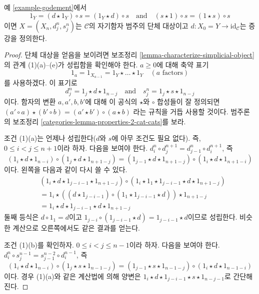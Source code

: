\begin{lemma}
\label{lemma-godement}
예 \ref{example-godement}에서
$$
1_Y = (d \star 1_Y) \circ s = (1_Y \star d) \circ s
\quad\text{and}\quad
(s \star 1) \circ s = (1 \star s) \circ s
$$
이면 $X = (X_n, d^n_j, s^n_j)$는 $\mathcal{C}$의 자기함자 범주의
단체 대상이고 $d : X_0 = Y \to \text{id}_\mathcal{C}$는 증강을
정의한다.
\end{lemma}

\begin{proof}
단체 대상을 얻음을 보이려면 보조정리
\ref{lemma-characterize-simplicial-object}의 관계 (1)(a)--(e)가
성립함을 확인해야 한다. $a \geq 0$에 대해 축약 표기
$$
1_a = 1_{X_{a - 1}} = 1_Y \star \ldots \star 1_Y \quad (a\text{ factors})
$$
를 사용하겠다. 이 표기로
$$
d^n_j = 1_j \star d \star 1_{n - j}
\quad\text{and}\quad
s^n_j = 1_j \star s \star 1_{n - j}
$$
이다. 함자의 변환 $a, a', b, b'$에 대해 이 공식의 $\star$와 $\circ$
합성들이 잘 정의되면
$(a' \circ a) \star (b' \circ b) = (a' \star b') \circ (a \star b)$
라는 규칙을 거듭 사용할 것이다. 범주론의 보조정리
\ref{categories-lemma-properties-2-cat-cats}를 보라.

\medskip\noindent
조건 (1)(a)는 언제나 성립한다($d$와 $s$에 아무 조건도 필요 없다).
즉, $0 \leq i < j \leq n + 1$이라 하자. 다음을 보여야 한다.
$d^n_i \circ d^{n + 1}_j = d^n_{j - 1} \circ d^{n + 1}_i$, 즉
$$
(1_i \star d \star 1_{n - i}) \circ
(1_j \star d \star 1_{n + 1 - j}) =
(1_{j - 1} \star d \star 1_{n + 1 - j}) \circ
(1_i \star d \star 1_{n + 1 - i})
$$
이다. 왼쪽을 다음과 같이 다시 쓸 수 있다.
\begin{align*}
& (1_i \star d \star 1_{j - i - 1} \star 1_{n + 1 - j}) \circ
(1_i \star 1_1 \star 1_{j - i - 1} \star d \star 1_{n + 1 - j}) \\
& =
1_i \star
\left((d \star 1_{j - i - 1}) \circ
(1_1 \star 1_{j - i - 1} \star d)\right) \star 1_{n + 1 - j} \\
& =
1_i \star d \star 1_{j - i - 1} \star d \star 1_{n + 1 - j} 
\end{align*}
둘째 등식은 $d \circ 1_1 = d$이고
$1_{j - i} \circ (1_{j - i - 1} \star d) = 1_{j - i - 1} \star d$이므로
성립한다. 비슷한 계산으로 오른쪽에서도 같은 결과를 얻는다.

\medskip\noindent
조건 (1)(b)를 확인하자. $0 \leq i < j \leq n - 1$이라 하자. 다음을
보여야 한다.
$d^n_i \circ s^{n - 1}_j = s^{n - 2}_{j - 1} \circ d^{n - 1}_i$, 즉
$$
(1_i \star d \star 1_{n - i}) \circ
(1_j \star s \star 1_{n - 1 - j}) =
(1_{j - 1} \star s \star 1_{n - 1 - j}) \circ
(1_i \star d \star 1_{n - 1 - i})
$$
이다. 경우 (1)(a)와 같은 계산법에 의해 양변은
$1_i \star d \star 1_{j - i - 1} \star s \star 1_{n - j - 1}$로
간단해진다.


\end{proof}
